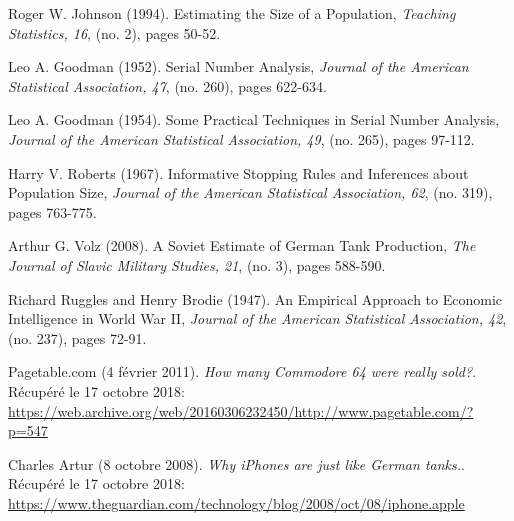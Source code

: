 \bigskip


\begin{thebibliography}{10}

 Roger W. Johnson (1994). Estimating the Size of a Population, {\em Teaching Statistics, 16}, (no. 2), pages 50-52.

 Leo A. Goodman (1952). Serial Number Analysis, {\em Journal of the American Statistical Association, 47}, (no. 260), pages 622-634.

 Leo A. Goodman (1954). Some Practical Techniques in Serial Number Analysis, {\em Journal of the American Statistical Association, 49}, (no. 265), pages 97-112.

 Harry V. Roberts (1967). Informative Stopping Rules and Inferences about Population Size, {\em Journal of the American Statistical Association, 62}, (no. 319), pages 763-775.

 Arthur G. Volz (2008). A Soviet Estimate of German Tank Production, {\em The Journal of Slavic Military Studies, 21}, (no. 3), pages 588-590.

 Richard Ruggles and Henry Brodie (1947). An Empirical Approach to Economic Intelligence in World War II, {\em Journal of the American Statistical Association, 42}, (no. 237), pages 72-91.

 Pagetable.com (4 février 2011). {\em How many Commodore 64 were really sold?}. Récupéré le 17 octobre 2018:  \href{https://web.archive.org/web/20160306232450/http://www.pagetable.com/?p=547}{https://web.archive.org/web/20160306232450/http://www.pagetable.com/?p=547}

 Charles Artur (8 octobre 2008). {\em Why iPhones are just like German tanks.}. Récupéré le 17 octobre 2018:  \href{https://www.theguardian.com/technology/blog/2008/oct/08/iphone.apple}{https://www.theguardian.com/technology/blog/2008/oct/08/iphone.apple}

\end{thebibliography}
